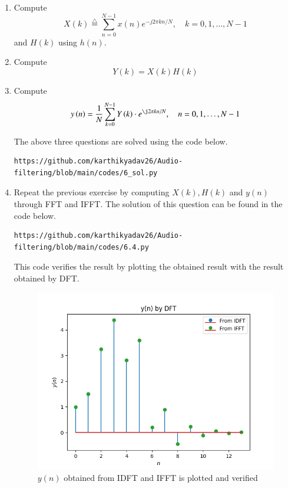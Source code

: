 \documentclass[journal,12pt,twocolumn]{IEEEtran}
\newcommand{\define}{\stackrel{\triangle}{=}}
\theoremstyle{remark}
\renewcommand\thesection{\arabic{section}}
\begin{document}
\begin{enumerate}[label=\thesection.\arabic*]
\item
Compute
\begin{equation}
X(k) \define \sum _{n=0}^{N-1}x(n) e^{-j2\pi kn/N}, \quad k = 0,1,\dots, N-1
\end{equation}
and $H(k)$ using $h(n)$.
\item Compute 
\begin{equation}
Y(k) = X(k)H(k)
\label{eq:fp}
\end{equation}
\item Compute
\begin{equation}
y\brak{n}={\frac {1}{N}}\sum _{k=0}^{N-1}Y\brak{k}\cdot e^{\j 2\pi kn/N},\quad n = 0,1,\dots, N-1
\label{eq:inv-ft}
\end{equation}

\solution The above three questions are solved using the code below.
\begin{lstlisting}
https://github.com/karthikyadav26/Audio-filtering/blob/main/codes/6_sol.py
\end{lstlisting}

\item Repeat the previous exercise by computing $X(k), H(k)$ and $y(n)$ through FFT and IFFT.
\solution The solution of this question can be found in the code below.
\begin{lstlisting}
https://github.com/karthikyadav26/Audio-filtering/blob/main/codes/6.4.py
\end{lstlisting}
This code verifies the result by plotting the obtained result with the result obtained by DFT.
\begin{figure}[htbp]
\centering
\includegraphics[width=\columnwidth]{figs/yn_verf_5.4.png}
\caption{$y(n)$ obtained from IDFT and IFFT is plotted and verified}
\label{fig:yn_verf_5.4}
\end{figure}


\end{enumerate}
\end{document}
